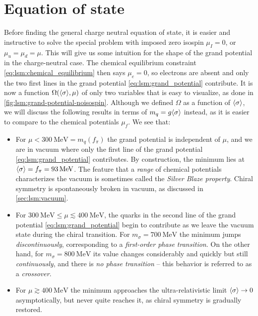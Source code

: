 \section{Equation of state}

Before finding the general charge neutral equation of state,
it is easier and instructive to solve the special problem with imposed zero isospin $\mu_I=0$, or $\mu_u=\mu_d=\mu$.
This will give us some intuition for the shape of the grand potential in the charge-neutral case.
The chemical equilibrium constraint \eqref{eq:lsm:chemical_equilibrium} then says $\mu_e=0$,
so electrons are absent and only the two first lines in the grand potential \eqref{eq:lsm:grand_potential} contribute.
It is now a function $\Omega(\langle \sigma \rangle,\mu)$ of only two variables that is easy to visualize, as done in \cref{fig:lsm:grand-potential-noisospin}.
Although we defined $\Omega$ as a function of $\langle \sigma \rangle$, we will discuss the following results in terms of $m_q = g \langle \sigma \rangle$ instead,
as it is easier to compare to the chemical potentials $\mu_f$.
We see that:
\begin{itemize}
\item For $\mu < \SI{300}{\mega\electronvolt} = m_q(f_\pi)$ the grand potential is independent of $\mu$,
      and we are in vacuum where only the first line of the grand potential \eqref{eq:lsm:grand_potential} contributes.
      By construction, the minimum lies at $\langle \sigma \rangle = f_\pi = \SI{93}{\mega\electronvolt}$.
      The feature that a \emph{range} of chemical potentials characterizes the vacuum is sometimes called the \emph{Silver Blaze property}.
      Chiral symmetry is spontaneously broken in vacuum, as discussed in \cref{sec:lsm:vacuum}.
\item For $\SI{300}{\mega\electronvolt} \leq \mu \lesssim \SI{400}{\mega\electronvolt}$,
      the quarks in the second line of the grand potential \eqref{eq:lsm:grand_potential} begin to contribute as we leave the vacuum state during the chiral transition.
      For $m_\sigma = \SI{700}{\mega\electronvolt}$ the minimum jumps \emph{discontinuously}, corresponding to a \emph{first-order phase transition}.
      On the other hand, for $m_\sigma = \SI{800}{\mega\electronvolt}$ its value changes considerably and quickly but still \emph{continuously},
      and there is \emph{no phase transition} -- this behavior is referred to as a \emph{crossover}.
\item For $\mu \gtrsim \SI{400}{\mega\electronvolt}$ the minimum approaches the ultra-relativistic limit $\langle \sigma \rangle \rightarrow 0$ asymptotically,
      but never quite reaches it,
      as chiral symmetry is gradually restored.
\end{itemize}

